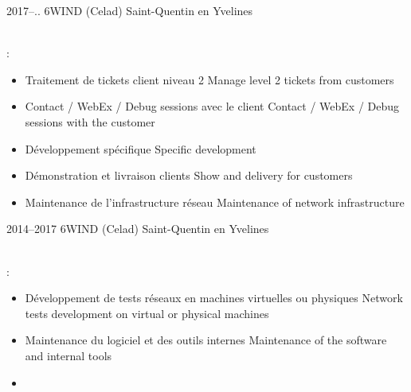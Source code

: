 \documentclass[print]{cv-style}
\begin{document}

\begin{entrylist}
\entry
  {2017--..}
  {6WIND (Celad)}
  {Saint-Quentin en Yvelines}
  {\\
  :
  \begin{itemize}
    \item \translate
    {Traitement de tickets client niveau 2}
    {Manage level 2 tickets from customers}
    \item \translate
    {Contact / WebEx / Debug sessions avec le client}
    {Contact / WebEx / Debug sessions with the customer}
    \item \translate
    {Développement spécifique}
    {Specific development}
    \item \translate
    {Démonstration et livraison clients}
    {Show and delivery for customers}
    \item \translate
    {Maintenance de l'infrastructure réseau}
    {Maintenance of network infrastructure}
  \end{itemize}}
\entry
  {2014--2017}
  {6WIND (Celad)}
  {Saint-Quentin en Yvelines}
  {\\
  :
  \begin{itemize}
    \item \translate
    {Développement de tests réseaux en machines virtuelles ou physiques}
    {Network tests development on virtual or physical machines}
    \item \translate
    {Maintenance du logiciel et des outils internes}
    {Maintenance of the software and internal tools}
    \item \translate

\end{itemize}}
\end{entrylist}
\end{document}
